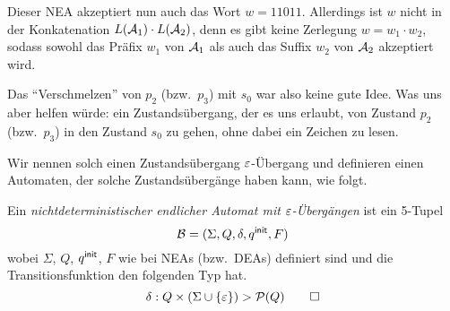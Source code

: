 \begin{Bsp}
\begin{center}
  \end{center}
Dieser \acs*{NEA} akzeptiert nun auch das Wort $w=11011$. Allerdings ist $w$ nicht in der Konkatenation $L(\mathcal{A}_1)\cdot L(\mathcal{A}_2)$, denn es gibt keine Zerlegung $w=w_1\cdot w_2$, sodass sowohl das Präfix $w_1$ von $\mathcal{A}_1$ als auch das Suffix $w_2$ von $\mathcal{A}_2$ akzeptiert wird.
\end{Bsp}


Das "`Verschmelzen"' von $p_2$ (bzw.\ $p_3$) mit $s_0$ war also keine gute Idee.
Was uns aber helfen würde: ein Zustandsübergang, der es uns erlaubt, von Zustand $p_2$ (bzw.\ $p_3$) in den Zustand $s_0$ zu gehen, ohne dabei ein Zeichen zu lesen.

Wir nennen solch einen Zustandsübergang $\varepsilon$-Übergang und definieren einen Automaten, der solche Zustandsübergänge haben kann, wie folgt.

\begin{Def}\label{def2.EpsNea}
        Ein \emph{nichtdeterministischer endlicher Automat mit $\varepsilon$-Übergängen} ist ein 5-Tupel
        \[ \mathcal{B}= (\Sigma, Q,\delta,q^\mathsf{init},F) \]
wobei $\Sigma$, $Q$, $q^\mathsf{init}$, $F$ wie bei \acs*{NEA}s (bzw.\ \acs*{DEA}s) definiert sind und die Transitionsfunktion den folgenden Typ hat.
\[
\delta:Q\times(\Sigma\cup\{\varepsilon\})\->\mathcal{P}(Q)
\qedhere
\]
\end{Def}

